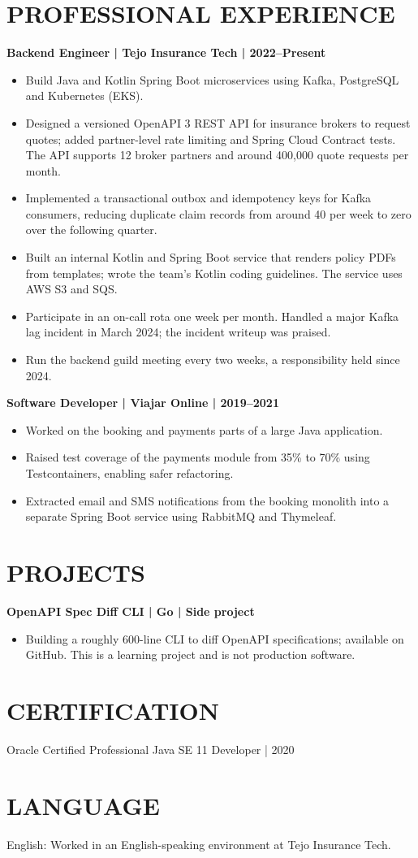 \documentclass[11pt,a4paper]{article}
\begin{document}
\section*{PROFESSIONAL EXPERIENCE}
\textbf{Backend Engineer | Tejo Insurance Tech | 2022–Present}
\begin{itemize}
\item Build Java and Kotlin Spring Boot microservices using Kafka, PostgreSQL and Kubernetes (EKS).
\item Designed a versioned OpenAPI 3 REST API for insurance brokers to request quotes; added partner-level rate limiting and Spring Cloud Contract tests. The API supports 12 broker partners and around 400,000 quote requests per month.
\item Implemented a transactional outbox and idempotency keys for Kafka consumers, reducing duplicate claim records from around 40 per week to zero over the following quarter.
\item Built an internal Kotlin and Spring Boot service that renders policy PDFs from templates; wrote the team's Kotlin coding guidelines. The service uses AWS S3 and SQS.
\item Participate in an on-call rota one week per month. Handled a major Kafka lag incident in March 2024; the incident writeup was praised.
\item Run the backend guild meeting every two weeks, a responsibility held since 2024.
\end{itemize}

\textbf{Software Developer | Viajar Online | 2019–2021}
\begin{itemize}
\item Worked on the booking and payments parts of a large Java application.
\item Raised test coverage of the payments module from 35\% to 70\% using Testcontainers, enabling safer refactoring.
\item Extracted email and SMS notifications from the booking monolith into a separate Spring Boot service using RabbitMQ and Thymeleaf.
\end{itemize}

\section*{PROJECTS}
\textbf{OpenAPI Spec Diff CLI | Go | Side project}
\begin{itemize}
\item Building a roughly 600-line CLI to diff OpenAPI specifications; available on GitHub. This is a learning project and is not production software.
\end{itemize}

\section*{CERTIFICATION}
Oracle Certified Professional Java SE 11 Developer | 2020

\section*{LANGUAGE}
English: Worked in an English-speaking environment at Tejo Insurance Tech.
\end{document}
